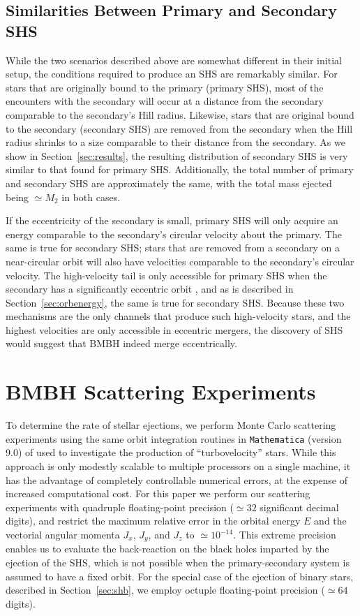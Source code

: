 \documentclass[a4paper,twocolumn]{emulateapj}
\begin{document}
{\subsection{Similarities Between Primary and Secondary SHS}\label{sec:similarity}
While the two scenarios described above are somewhat different in their initial setup, the conditions required to produce an SHS are remarkably similar. For stars that are originally bound to the primary (primary SHS), most of the encounters with the secondary will occur at a distance from the secondary comparable to the secondary's Hill radius. Likewise, stars that are original bound to the secondary (secondary SHS) are removed from the secondary when the Hill radius shrinks to a size comparable to their distance from the secondary. As we show in Section~\ref{sec:results}, the resulting distribution of secondary SHS is very similar to that found for primary SHS. Additionally, the total number of primary and secondary SHS are approximately the same, with the total mass ejected being $\simeq M_{2}$ in both cases.

If the eccentricity of the secondary is small, primary SHS will only acquire an energy comparable to the secondary's circular velocity about the primary. The same is true for secondary SHS; stars that are removed from a secondary on a near-circular orbit will also have velocities comparable to the secondary's circular velocity. The high-velocity tail is only accessible for primary SHS when the secondary has a significantly eccentric orbit \citep{Sesana:2006a}, and as is described in Section~\ref{sec:orbenergy}, the same is true for secondary SHS. Because these two mechanisms are the only channels that produce such high-velocity stars, and the highest velocities are only accessible in eccentric mergers, the discovery of SHS would suggest that BMBH indeed merge eccentrically.

\section{BMBH Scattering Experiments}\label{sec:experiments}
To determine the rate of stellar ejections, we perform Monte Carlo scattering experiments using the same orbit integration routines in {\tt Mathematica} (version 9.0) of \citet{Manukian:2013a} used to investigate the production of ``turbovelocity'' stars. While this approach is only modestly scalable to multiple processors on a single machine, it has the advantage of completely controllable numerical errors, at the expense of increased computational cost. For this paper we perform our scattering experiments with quadruple floating-point precision ($\simeq 32$ significant decimal digits), and restrict the maximum relative error in the orbital energy $E$ and the vectorial angular momenta $J_{x}$, $J_{y}$, and $J_{z}$ to $\simeq 10^{-14}$. This extreme precision enables us to evaluate the back-reaction on the black holes imparted by the ejection of the SHS, which is not possible when the primary-secondary system is assumed to have a fixed orbit. For the special case of the ejection of binary stars, described in Section~\ref{sec:shb}, we employ octuple floating-point precision ($\simeq 64$ digits).

}
\end{document}
